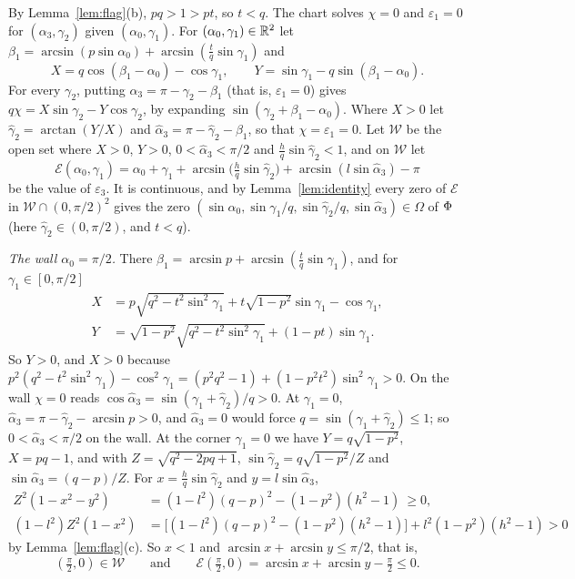 By Lemma~\ref{lem:flag}(b), $pq>1>pt$, so $t<q$. The chart solves $\chi=0$
and $\varepsilon_1=0$ for $(\alpha_3,\gamma_2)$ given $(\alpha_0,\gamma_1)$. For
$(\alpha_0,\gamma_1)\in\mathbb{R}^2$ let
$\beta_1=\arcsin(p\sin\alpha_0)+\arcsin(\frac tq\sin\gamma_1)$ and
\[
  X=q\cos(\beta_1-\alpha_0)-\cos\gamma_1,\qquad Y=\sin\gamma_1-q\sin(\beta_1-\alpha_0).
\]
For every $\gamma_2$, putting $\alpha_3=\pi-\gamma_2-\beta_1$ (that is,
$\varepsilon_1=0$) gives $q\chi=X\sin\gamma_2-Y\cos\gamma_2$, by expanding
$\sin(\gamma_2+\beta_1-\alpha_0)$. Where $X>0$ let $\hat\gamma_2=\arctan(Y/X)$
and $\hat\alpha_3=\pi-\hat\gamma_2-\beta_1$, so that $\chi=\varepsilon_1=0$.
Let $\mathcal W$ be the open set where $X>0$, $Y>0$,
$0<\hat\alpha_3<\pi/2$ and $\frac hq\sin\hat\gamma_2<1$, and on $\mathcal W$ let
\[
  \mathcal E(\alpha_0,\gamma_1)=\alpha_0+\gamma_1+\arcsin\bigl(\tfrac hq\sin\hat\gamma_2\bigr)
  +\arcsin(l\sin\hat\alpha_3)-\pi
\]
be the value of $\varepsilon_3$. It is continuous, and by
Lemma~\ref{lem:identity} every zero of $\mathcal E$ in
$\mathcal W\cap(0,\pi/2)^2$ gives the zero
$(\sin\alpha_0,\sin\gamma_1/q,\sin\hat\gamma_2/q,\sin\hat\alpha_3)\in\Omega$ of
$\Phi$ (here $\hat\gamma_2\in(0,\pi/2)$, and $t<q$).

\emph{The wall $\alpha_0=\pi/2$.} There
$\beta_1=\arcsin p+\arcsin(\frac tq\sin\gamma_1)$, and for $\gamma_1\in[0,\pi/2]$
\begin{align*}
  X&=p\sqrt{q^2-t^2\sin^2\gamma_1}+t\sqrt{1-p^2}\sin\gamma_1-\cos\gamma_1,\\
  Y&=\sqrt{1-p^2}\sqrt{q^2-t^2\sin^2\gamma_1}+(1-pt)\sin\gamma_1 .
\end{align*}
So $Y>0$, and $X>0$ because
$p^2(q^2-t^2\sin^2\gamma_1)-\cos^2\gamma_1=(p^2q^2-1)+(1-p^2t^2)\sin^2\gamma_1>0$.
On the wall $\chi=0$ reads $\cos\hat\alpha_3=\sin(\gamma_1+\hat\gamma_2)/q>0$.
At $\gamma_1=0$, $\hat\alpha_3=\pi-\hat\gamma_2-\arcsin p>0$, and
$\hat\alpha_3=0$ would force $q=\sin(\gamma_1+\hat\gamma_2)\le1$; so
$0<\hat\alpha_3<\pi/2$ on the wall. At the corner $\gamma_1=0$ we have
$Y=q\sqrt{1-p^2}$, $X=pq-1$, and with $Z=\sqrt{q^2-2pq+1}$,
$\sin\hat\gamma_2=q\sqrt{1-p^2}/Z$ and $\sin\hat\alpha_3=(q-p)/Z$. For
$x=\frac hq\sin\hat\gamma_2$ and $y=l\sin\hat\alpha_3$,
\begin{align*}
  Z^2(1-x^2-y^2)&=(1-l^2)(q-p)^2-(1-p^2)(h^2-1)\ \ge 0,\\
  (1-l^2)Z^2(1-x^2)&=\bigl[(1-l^2)(q-p)^2-(1-p^2)(h^2-1)\bigr]+l^2(1-p^2)(h^2-1)>0
\end{align*}
by Lemma~\ref{lem:flag}(c). So $x<1$ and $\arcsin x+\arcsin y\le\pi/2$, that is,
\begin{equation}\label{eq:corner}
  (\tfrac\pi2,0)\in\mathcal W\qquad\text{and}\qquad
  \mathcal E(\tfrac\pi2,0)=\arcsin x+\arcsin y-\tfrac\pi2\le0 .
\end{equation}

